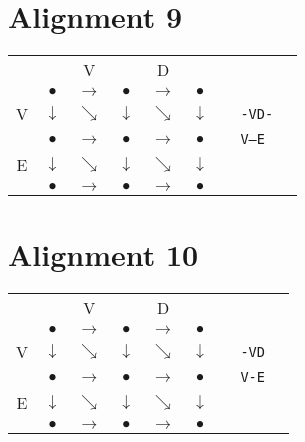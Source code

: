 \documentclass[landscape]{foils}
\begin{document}
\myNewSlide
\section*{Alignment 9}

{
\huge
\begin{center}
\begin{tabular}{cccccccp{1in}c}
   &              & V            &  & D & \\   
   & {\color{red} $\bullet$}      & {\color{black}$\rightarrow$}   & {\color{black} $\bullet$}        &   {\color{black}$\rightarrow$} & {\color{black}$\bullet$} \\
V  & {\color{red} $\downarrow$} & {\color{black}$\searrow$}    & {\color{black} $\downarrow$ } & {\color{black}$\searrow$}    & {\color{black} $\downarrow$ }  & & {\tt -VD-} \\
   & {\color{red} $\bullet$ }   & {\color{red}$\rightarrow$} &    {\color{red} $\bullet$ }   & {\color{red}$\rightarrow$} & {\color{red}  $\bullet$ } & & {\tt V--E}\\   
E  & {\color{black} $\downarrow$} & {\color{black}$\searrow$}    & {\color{black} $\downarrow$ } & {\color{black}$\searrow$}    & {\color{red} $\downarrow$ }  \\
   & {\color{black} $\bullet$ }   & {\color{black}$\rightarrow$} & {\color{black} $\bullet$ }   & {\color{black}$\rightarrow$} & {\color{red}  $\bullet$ } \\   
\end{tabular}
\end{center}
}


\myNewSlide
\section*{Alignment 10}

{
\huge
\begin{center}
\begin{tabular}{cccccccp{1in}c}
   &              & V            &  & D & \\   
   & {\color{red} $\bullet$}      & {\color{black}$\rightarrow$}   & {\color{black} $\bullet$}        &   {\color{black}$\rightarrow$} & {\color{black}$\bullet$} \\
V  & {\color{red} $\downarrow$} & {\color{black}$\searrow$}    & {\color{black} $\downarrow$ } & {\color{black}$\searrow$}    & {\color{black} $\downarrow$ }  & & {\tt -VD} \\
   & {\color{red} $\bullet$ }   & {\color{red}$\rightarrow$} &    {\color{red} $\bullet$ }   & {\color{black}$\rightarrow$} & {\color{black}  $\bullet$ } & & {\tt V-E} \\   
E  & {\color{black} $\downarrow$} & {\color{black}$\searrow$}    & {\color{black} $\downarrow$ } & {\color{red}$\searrow$}    & {\color{black} $\downarrow$ }  \\
   & {\color{black} $\bullet$ }   & {\color{black}$\rightarrow$} & {\color{black} $\bullet$ }   & {\color{black}$\rightarrow$} & {\color{red}  $\bullet$ } \\   
\end{tabular}
\end{center}
}
\end{document}

